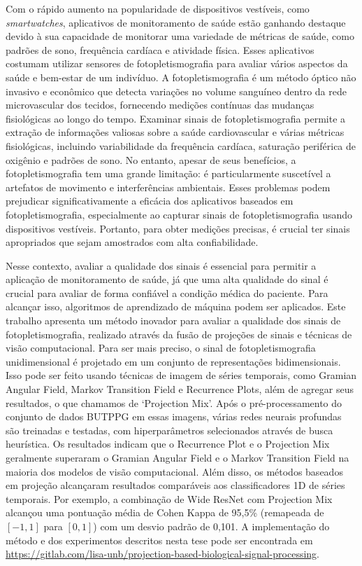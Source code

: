 Com o rápido aumento na popularidade de dispositivos vestíveis, como \textit{smartwatches}, aplicativos de monitoramento de saúde estão ganhando destaque devido à sua capacidade de monitorar uma variedade de métricas de saúde, como padrões de sono, frequência cardíaca e atividade física. Esses aplicativos costumam utilizar sensores de fotopletismografia para avaliar vários aspectos da saúde e bem-estar de um indivíduo. A fotopletismografia é um método óptico não invasivo e econômico que detecta variações no volume sanguíneo dentro da rede microvascular dos tecidos, fornecendo medições contínuas das mudanças fisiológicas ao longo do tempo. Examinar sinais de fotopletismografia permite a extração de informações valiosas sobre a saúde cardiovascular e várias métricas fisiológicas, incluindo variabilidade da frequência cardíaca, saturação periférica de oxigênio e padrões de sono. No entanto, apesar de seus benefícios, a fotopletismografia tem uma grande limitação: é particularmente suscetível a artefatos de movimento e interferências ambientais. Esses problemas podem prejudicar significativamente a eficácia dos aplicativos baseados em fotopletismografia, especialmente ao capturar sinais de fotopletismografia usando dispositivos vestíveis. Portanto, para obter medições precisas, é crucial ter sinais apropriados que sejam amostrados com alta confiabilidade.

Nesse contexto, avaliar a qualidade dos sinais é essencial para permitir a aplicação de monitoramento de saúde, já que uma alta qualidade do sinal é crucial para avaliar de forma confiável a condição médica do paciente. Para alcançar isso, algoritmos de aprendizado de máquina podem ser aplicados. Este trabalho apresenta um método inovador para avaliar a qualidade dos sinais de fotopletismografia, realizado através da fusão de projeções de sinais e técnicas de visão computacional. Para ser mais preciso, o sinal de fotopletismografia unidimensional é projetado em um conjunto de representações bidimensionais. Isso pode ser feito usando técnicas de imagem de séries temporais, como Gramian Angular Field, Markov Transition Field e Recurrence Plots, além de agregar seus resultados, o que chamamos de `Projection Mix'. Após o pré-processamento do conjunto de dados \acrlong{BUTPPG} em essas imagens, várias redes neurais profundas são treinadas e testadas, com hiperparâmetros selecionados através de busca heurística. Os resultados indicam que o Recurrence Plot e o Projection Mix geralmente superaram o Gramian Angular Field e o Markov Transition Field na maioria dos modelos de visão computacional. Além disso, os métodos baseados em projeção alcançaram resultados comparáveis aos classificadores 1D de séries temporais. Por exemplo, a combinação de Wide ResNet com Projection Mix alcançou uma pontuação média de Cohen Kappa de 95,5\% (remapeada de $[-1,1]$ para $[0,1]$) com um desvio padrão de 0,101. A implementação do método e dos experimentos descritos nesta tese pode ser encontrada em \url{https://gitlab.com/lisa-unb/projection-based-biological-signal-processing}.
